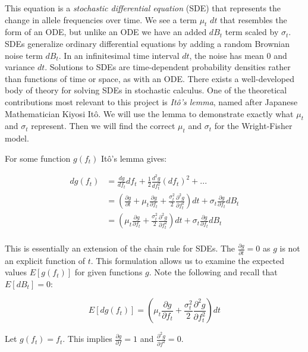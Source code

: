 This equation is a \textit{stochastic differential equation} (SDE) that represents the change in allele frequencies over time. We see a term $\mu_t \, \, dt$ that resembles the form of an ODE, but unlike an ODE we have an added $dB_t$ term scaled by $\sigma_t$. SDEs generalize ordinary differential equations by adding a random Brownian noise term $dB_{t}$. In an infinitesimal time interval $dt$, the noise has mean $0$ and variance $dt$. Solutions to SDEs are time-dependent probability densities rather than functions of time or space, as with an ODE. There exists a well-developed body of theory for solving SDEs in stochastic calculus. One of the theoretical contributions most relevant to this project is \textit{It\^{o}'s lemma}, named after Japanese Mathematician Kiyosi It\^{o}. \cite{ito_stochastic_1944} We will use the lemma to demonstrate exactly what $\mu_t$ and $\sigma_t$ represent. Then we will find the correct $\mu_t$ and $\sigma_t$ for the Wright-Fisher model. 


For some function $g(f_t)$ It\^{o}'s lemma gives:

\begin{equation}
    \begin{split}
        dg(f_t) 
                &= \frac{dg}{df_t}df_t + \frac{1}{2} \frac{d^2g}{df_t^2}(df_t)^2 + ... \\
                &= (\frac{\partial g}{\partial t} + \mu_t \frac{\partial g}{\partial f_t} + \frac{\sigma_t^2}{2} \frac{\partial^2 g}{\partial f_t^2})dt + \sigma_t \frac{\partial g}{\partial f_t}dB_t \\
                &= (\mu_t \frac{\partial g}{\partial f_t} + \frac{\sigma_t^2}{2} \frac{\partial^2 g}{\partial f_t^2})dt + \sigma_t \frac{\partial g}{\partial f_t}dB_t \\
    \end{split}
\end{equation}


This is essentially an extension of the chain rule for SDEs. The $\frac{\partial g}{\partial t} = 0$ as $g$ is not an explicit function of $t$. This formulation allows us to examine the expected values $E[g(f_t)]$ for given functions $g$. Note the following and recall that $E[dB_t] = 0$:

\begin{equation}
    E[dg(f_t)] = (\mu_t \frac{\partial g}{\partial f_t} + \frac{\sigma_t^2}{2} \frac{\partial^2 g}{\partial f_t^2})dt
\end{equation}


Let $g(f_t) = f_t$. This implies $\frac{\partial g}{\partial f} = 1$ and $\frac{\partial^2 g}{\partial f^2} = 0$.


